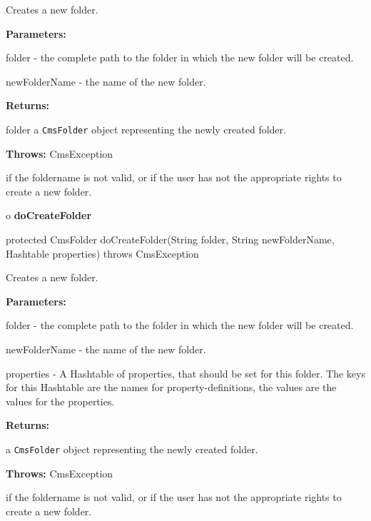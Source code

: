 \begin{description}
\htmlDD Creates a new folder.

\begin{description}
\item {\bf Parameters:}

folder - the complete path to the folder in which the new folder will be
created.

newFolderName - the name of the new folder.
\item {\bf Returns:}

folder a {\tt CmsFolder} object representing the newly created folder.
\item {\bf Throws:} CmsException

if the foldername is not valid, or if the user has not the appropriate rights
to create a new folder.
\end{description}

\end{description}

o {\bf doCreateFolder}

\begin{PRE}
 protected CmsFolder doCreateFolder(String folder,
                                    String newFolderName,
                                    Hashtable properties) throws CmsException
\end{PRE}

\begin{description}
\htmlDD Creates a new folder.

\begin{description}
\item {\bf Parameters:}

folder - the complete path to the folder in which the new folder will be
created.

newFolderName - the name of the new folder.

properties - A Hashtable of properties, that should be set for this folder.
The keys for this Hashtable are the names for property-definitions, the values
are the values for the properties.
\item {\bf Returns:}

a {\tt CmsFolder} object representing the newly created folder.
\item {\bf Throws:} CmsException

if the foldername is not valid, or if the user has not the appropriate rights
to create a new folder.
\end{description}

\end{description}

